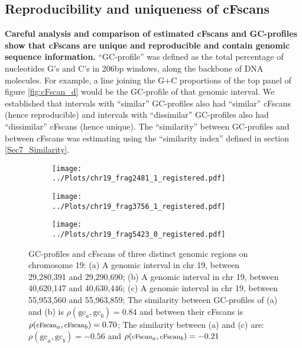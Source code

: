 \subsection{Reproducibility and uniqueness of cFscans}
{\bf{Careful analysis and comparison of estimated cFscans and GC-profiles show that cFscans are unique and reproducible and contain genomic sequence information.}} ``GC-profile'' was defined as the total percentage of nucleotides G's and C's in 206bp windows, along the backbone of DNA molecules. For example, a line joining the G+C proportions of the top panel of figure \ref{fig:cFscan_d} would be the GC-profile of that genomic interval. We established that intervals with ``similar'' GC-profiles also had ``similar'' cFscans (hence reproducible) and intervals with ``dissimilar'' GC-profiles also had ``dissimilar'' cFscans (hence unique). The ``similarity'' between GC-profiles and between cFscans was estimating using the ``similarity index'' defined in section \ref{Sec7_Similarity}. 

\begin{figure}[H]
\centering
\begin{subfigure}{0.33\linewidth}
\texttt{[image: ../Plots/chr19\_frag2481\_1\_registered.pdf]}
\caption{}
\label{fig:cFscanGC_a}
\end{subfigure}
\begin{subfigure}{0.31\linewidth}
\vspace{0.25cm}
\texttt{[image: ../Plots/chr19\_frag3756\_1\_registered.pdf]} \\
\caption{}
\label{fig:cFscanGC_b}
\end{subfigure}
\begin{subfigure}{0.33\linewidth}
\texttt{[image: ../Plots/chr19\_frag5423\_0\_registered.pdf]}
\caption{}
\label{fig:cFscanGC_c}
\end{subfigure}
\caption{GC-profiles and cFscans of three distinct genomic regions on chromosome 19: (a) A genomic interval in chr 19, between 29,280,391 and 29,290,690; (b) A genomic interval in chr 19, between 40,620,147 and 40,630,446; (c) A genomic interval in chr 19, between 55,953,560 and 55,963,859; The similarity between GC-profiles of (a) and (b) is $\rho(\text{gc}_a, \text{gc}_b) = 0.84$ and between their cFscans is $\rho(\text{\footnotesize{cFscan}}_a, \text{\footnotesize{cFscan}}_b) = 0.70$; The similarity between (a) and (c) are: $\rho(\text{gc}_a, \text{gc}_b) = -0.56$ and $\rho(\text{\footnotesize{cFscan}}_a, \text{\footnotesize{cFscan}}_b) = -0.21$} 
\label{fig:cFscanGC}
\end{figure}

